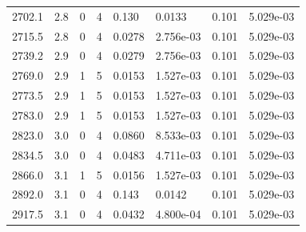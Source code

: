 \documentclass[preview]{standalone}
\begin{document}
{{{{\begin{tabular}{L{1.2cm}C{1.2cm} C{0.3cm}C{0.5cm} C{1.4cm}C{1.4cm} C{1.4cm}C{1.4cm}}
  2702.1  &   2.8  & 0     &  4 &  0.130  & 0.0133  & 0.101 &  5.029e-03   \\ 
  2715.5  &   2.8  & 0     &  4 &  0.0278  & 2.756e-03  & 0.101 &  5.029e-03   \\ 
  2739.2  &   2.9  & 0     &  4 &  0.0279  & 2.756e-03  & 0.101 &  5.029e-03   \\ 
  2769.0  &   2.9  & 1     &  5 &  0.0153  & 1.527e-03  & 0.101 &  5.029e-03   \\ 
  2773.5  &   2.9  & 1     &  5 &  0.0153  & 1.527e-03  & 0.101 &  5.029e-03   \\ 
  2783.0  &   2.9  & 1     &  5 &  0.0153  & 1.527e-03  & 0.101 &  5.029e-03   \\ 
  2823.0  &   3.0  & 0     &  4 &  0.0860  & 8.533e-03  & 0.101 &  5.029e-03   \\ 
  2834.5  &   3.0  & 0     &  4 &  0.0483  & 4.711e-03  & 0.101 &  5.029e-03   \\ 
  2866.0  &   3.1  & 1     &  5 &  0.0156  & 1.527e-03  & 0.101 &  5.029e-03   \\ 
  2892.0  &   3.1  & 0     &  4 &  0.143  & 0.0142  & 0.101 &  5.029e-03   \\ 
  2917.5  &   3.1  & 0     &  4 &  0.0432  & 4.800e-04  & 0.101 &  5.029e-03   \\ 
\hline 
\end{tabular} 

}}}}
\end{document}

